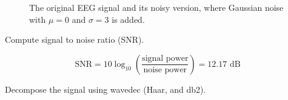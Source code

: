 \begin{figure}[H]
    \centering
    \caption{The original EEG signal and its noisy version, where Gaussian noise with $\mu = 0$ and $\sigma = 3$ is added.}
    \label{fig:EEG_with_and_without_noise}
\end{figure}

\vspace{0.5cm}



\begin{tcolorbox}[colback=green!5!white,colframe=green!75!black,title=Problem 2.a]
    Compute signal to noise ratio (SNR).
\end{tcolorbox}


\begin{equation}
    \text{SNR} = 10 \log_{10} \left( \frac{\text{signal power}}{\text{noise power}} \right) = 12.17 \text{ dB}
\end{equation}



\begin{tcolorbox}[colback=green!5!white,colframe=green!75!black,title=Problem 2.b]
    Decompose the signal using wavedec (Haar, and db2).
\end{tcolorbox}



